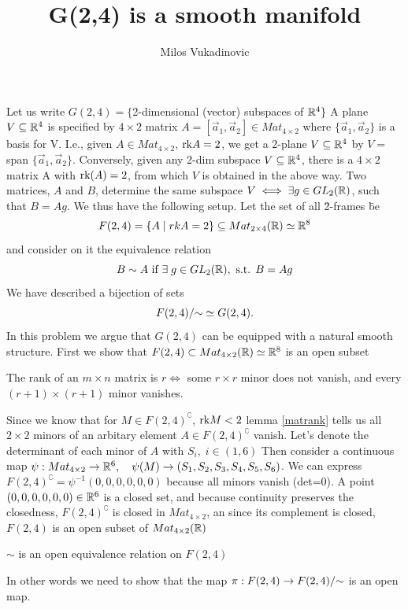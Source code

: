 \documentclass[11pt,a4paper]{report}
\author{Milos Vukadinovic}
\title{G(2,4) is a smooth manifold}
\begin{document}
Let us write $G(2,4) = \{ $2-dimensional (vector) subspaces of $\mathbb{R}^4 \}$ A plane $V \subseteq \mathbb{R}^4$ is specified by $4\times2$ matrix $A=[\vec{a}_1,\vec{a}_2] \in Mat_{4\times 2}$ where 
$\{\vec{a}_1, \vec{a}_2\}$ is a basis for V. I.e., given $A \in Mat_{4\times 2}$, $\textrm{rk} A = 2$, we get a 2-plane $V \subseteq \mathbb{R}^4$ by $V=$span $\{\vec{a}_1,\vec{a}_2\} $. Conversely, given any 2-dim subspace $V\subseteq \mathbb{R}^4$, there is a $4\times 2$
 matrix A with $\textrm{rk}(A)=2$, from which $V$ is obtained in the above way. Two matrices, $A$ and $B$, determine the same subspace $V \iff \exists g \in GL_2(\mathbb{R}) $, such that $B = A g$. 
\newline
We thus have the following setup. Let the set of all \" 2-frames \" be
$$ F(2,4) = \{ A \; | \;  rkA=2 \} \subseteq Mat_{2\times4}(\mathbb{R})  \simeq \mathbb{R}^8 $$
and consider on it the equivalence relation
$$ B \sim A \text{ if } \exists \; g \in GL_2(\mathbb{R}), \text{ s.t. } B=Ag $$
We have described a bijection of sets
$$ F(2,4)/{\sim} \simeq  G(2,4). $$ 
In this problem we argue that $G(2,4)$ can be equipped with a natural smooth structure. 
\newline
\newline
First we show that $F(2,4) \subset Mat_{4 \times 2} (\mathbb{R}) \simeq \mathbb{R}^8$ is an open subset
\begin{Lemma}\label{matrank}
    The rank of an $m \times n$ matrix is $r \iff$ some $r \times r$ minor does not vanish,
    and every $(r+1) \times (r+1)$ minor vanishes.
\end{Lemma}
Since we know that for $M \in F(2,4)^\complement$, $\textrm{rk} M <2$ lemma \ref{matrank} tells us all $2 \times 2$ minors
of an arbitary element $ A \in F(2,4)^\complement$ vanish. Let's denote the determinant of each minor of $A$ with $S_i, \; i\in (1,6)$ 
Then consider a continuous map
$ \psi: Mat_{4\times2} \to \mathbb{R}^6, \quad \psi(M) \to (S_1,S_2,S_3,S_4,S_5,S_6)$.
We can express $F(2,4)^\complement = \psi ^{-1} (0,0,0,0,0,0)$ because all minors vanish (det=0).
A point $(0,0,0,0,0,0) \in \mathbb{R}^6$ is a closed set, and because continuity preserves the closedness, $F(2,4)^\complement$ is closed in $Mat_{4 \times 2}$,
an since its complement is closed, $F(2,4)$ is an open subset of $Mat_{4 \times 2}(\mathbb{R})$
\newline
\newline
\begin{Prop}
    $\sim$ is an open equivalence relation on $F(2,4)$
\end{Prop}
In other words we need to show that the map $\pi: F(2,4) \to F(2,4)/{\sim}$ is an open map.
\end{document}
